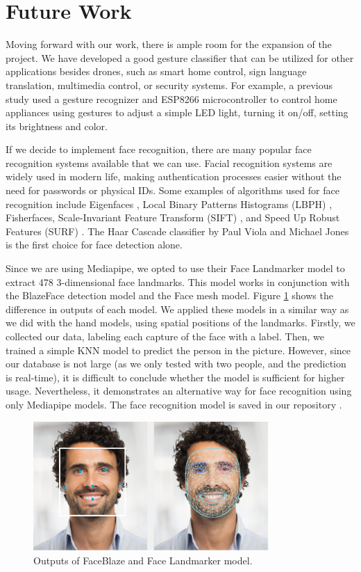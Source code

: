 \section{Future Work}
Moving forward with our work, there is ample room for the expansion of the project. We have developed a good gesture classifier that can be utilized for other applications besides drones, such as smart home control, sign language translation, multimedia control, or security systems. For example, a previous study \cite{doi:10.1080/08839514.2023.2176607} used a gesture recognizer and ESP8266 microcontroller to control home appliances using gestures to adjust a simple LED light, turning it on/off, setting its brightness and color.

If we decide to implement face recognition, there are many popular face recognition systems available that we can use. Facial recognition systems are widely used in modern life, making authentication processes easier without the need for passwords or physical IDs. Some examples of algorithms used for face recognition include Eigenfaces \cite{CARIKCI2012118}, Local Binary Patterns Histograms (LBPH) \cite{inproceedings}, Fisherfaces, Scale-Invariant Feature Transform (SIFT) \cite{articlefr}, and Speed Up Robust Features (SURF) \cite{10.1007/11744023_32}. The Haar Cascade classifier by Paul Viola and Michael Jones \cite{inproceedings} is the first choice for face detection alone.

Since we are using Mediapipe, we opted to use their Face Landmarker model to extract 478 3-dimensional face landmarks. This model works in conjunction with the BlazeFace detection model and the Face mesh model. Figure \ref{fig:face_landmark} shows the difference in outputs of each model. We applied these models in a similar way as we did with the hand models, using spatial positions of the landmarks. Firstly, we collected our data, labeling each capture of the face with a label. Then, we trained a simple KNN model to predict the person in the picture. However, since our database is not large (as we only tested with two people, and the prediction is real-time), it is difficult to conclude whether the model is sufficient for higher usage. Nevertheless, it demonstrates an alternative way for face recognition using only Mediapipe models. The face recognition model is saved in our repository \cite{touchlessdronecontrol}.

\begin{figure}[h]
	\centering
	\includegraphics[width=0.8\textwidth]{images/face_landmark.png}
	\caption{Outputs of FaceBlaze and Face Landmarker model.}
	\label{fig:face_landmark}
\end{figure}




